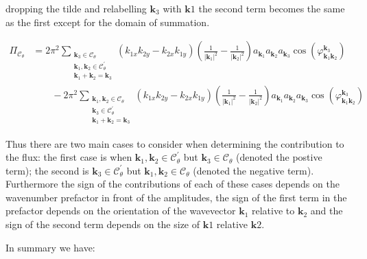 \documentclass[9pt]{article}
\newcommand{\bfk}{\mathbf{k}}								%
\newcommand{\bfkn}[1]{\mathbf{k}_{#1}}								%
\begin{document}
dropping the tilde and relabelling $\bfkn{3}$ with $\bfk{1}$ the second term becomes the same as the first except for the domain of summation. 

\begin{align}
\Pi_{\mathcal{C}_{\theta}} &= 2 \pi^2 \sum_{\substack{\bfkn{3} \in \mathcal{C}_{\theta} \\ \bfkn{1},  \bfkn{2} \in \mathcal{C}_{\theta}^{'} \\ \bfkn{1} + \bfkn{2} = \bfkn{3}}} \left(k_{1 x} k_{2 y}-k_{2 x} k_{1 y}\right)\left(\frac{1}{\left|\mathbf{k}_{1}\right|^{2}}-\frac{1}{\left|\mathbf{k}_{2}\right|^{2}}\right) a_{\mathbf{k}_{1}} a_{\mathbf{k}_{2}} a_{\mathbf{k}_{3}} \cos \left(\varphi_{\mathbf{k}_{1} \mathbf{k}_{2}}^{\mathbf{k}_{3}}\right) \\
&\qquad - 2 \pi^2 \sum_{\substack{\bfkn{1}, \bfkn{2} \in \mathcal{C}_{\theta} \\ \bfkn{3} \in \mathcal{C}_{\theta}^{'} \\ \bfkn{1} + \bfkn{2} = \bfkn{3}}} \left(k_{1 x} k_{2 y}-k_{2 x} k_{1 y}\right)\left(\frac{1}{\left|\mathbf{k}_{1}\right|^{2}}-\frac{1}{\left|\mathbf{k}_{2}\right|^{2}}\right) a_{\mathbf{k}_{1}} a_{\mathbf{k}_{2}} a_{\mathbf{k}_{3}} \cos \left(\varphi_{\mathbf{k}_{1} \mathbf{k}_{2}}^{\mathbf{k}_{3}}\right)
\end{align}

Thus there are two main cases to consider when determining the contribution to the flux: the first case is when $\bfkn{1}, \bfkn{2} \in \mathcal{C}_{\theta}^{'}$ but $\bfkn{3} \in \mathcal{C}_{\theta}$ (denoted the postive term); the second is $\bfkn{3} \in \mathcal{C}_{\theta}^{'}$ but $\bfkn{1}, \bfkn{2} \in \mathcal{C}_{\theta}$ (denoted the negative term). Furthermore the sign of the contributions of each of these cases depends on the wavenumber prefactor in front of the amplitudes, the sign of the first term in the prefactor depends on the orientation of the wavevector $\bfkn{1}$ relative to $\bfkn{2}$ and the sign of the second term depends on the size of $\bfk{1}$ relative $\bfk{2}$. 

In summary we have:
\end{document}
